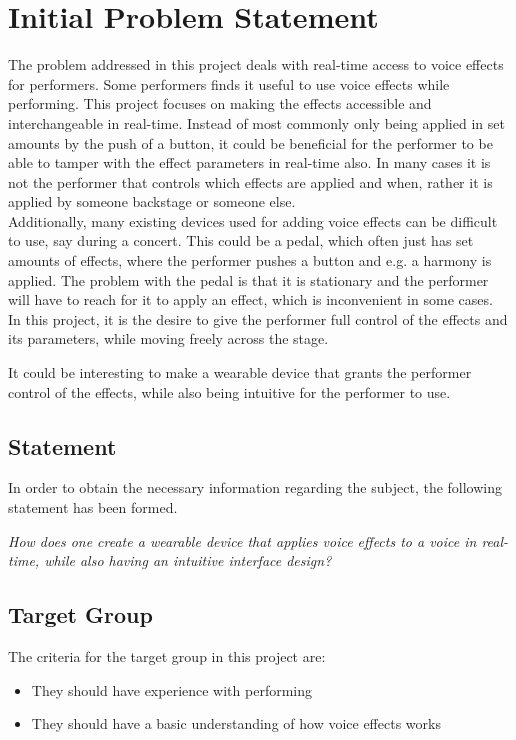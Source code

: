 \section{Initial Problem Statement}

The problem addressed in this project deals with real-time access to voice effects for performers. 
Some performers finds it useful to use voice effects while performing. This project focuses on making the effects accessible and interchangeable in real-time. Instead of most commonly only being applied in set amounts by the push of a button, it could be beneficial for the performer to be able to tamper with the effect parameters in real-time also. In many cases it is not the performer that controls which effects are applied and when, rather it is applied by someone backstage or someone else. \\

Additionally, many existing devices used for adding voice effects can be difficult to use, say during a concert. This could be a pedal, which often just has set amounts of effects, where the performer pushes a button and e.g. a harmony is applied. The problem with the pedal is that it is stationary and the performer will have to reach for it to apply an effect, which is inconvenient in some cases.\\

In this project, it is the desire to give the performer full control of the effects and its parameters, while moving freely across the stage.

It could be interesting to make a wearable device that grants the performer control of the effects, while also being intuitive for the performer to use.


\subsection{Statement}
In order to obtain the necessary information regarding the subject, the following statement has been formed.

\textit{How does one create a wearable device that applies voice effects to a voice in real-time, while also having an intuitive interface design?}


\subsection{Target Group}
The criteria for the target group in this project are:

\begin{itemize}
	\item They should have experience with performing
	\item They should have a basic understanding of how voice effects works
\end{itemize}

